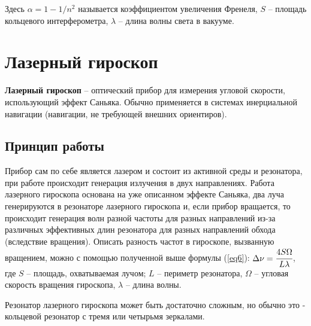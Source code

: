 \documentclass[a4paper, 12pt, openany]{book}
\begin{document}
	Здесь $\alpha = 1 - 1/n^2$ называется коэффициентом увеличения Френеля, $S$ -- площадь кольцевого интерферометра, $\lambda$ -- длина волны света в вакууме.
	
	\section{Лазерный гироскоп}
	\textbf{Лазерный гироскоп} -- оптический прибор для измерения угловой скорости, использующий эффект Саньяка. Обычно применяется в системах инерциальной навигации (навигации, не требующей внешних ориентиров).
	
	\subsection{Принцип работы}
	Прибор сам по себе является лазером и состоит из активной среды и резонатора, при работе происходит генерация излучения в двух направлениях. Работа лазерного гироскопа основана на уже описанном эффекте Саньяка, два луча генерируются в резонаторе лазерного гироскопа и, если прибор вращается, то происходит генерация волн разной частоты для разных направлений из-за различных эффективных длин резонатора для разных направлений обхода (вследствие вращения). Описать разность частот в гироскопе, вызванную вращением, можно с помощью полученной выше формулы (\ref{eq6}): $\Delta \nu = \cfrac{4 S \Omega}{L \lambda}$, где $S$ -- площадь, охватываемая лучом;  $L$ -- периметр резонатора, $\Omega$  -- угловая скорость вращения гироскопа, $\lambda$  -- длина волны.
	
	Резонатор лазерного гироскопа может быть достаточно сложным, но обычно это - кольцевой резонатор с тремя или четырьмя зеркалами.
	
	
	
	
\end{document}
